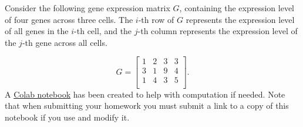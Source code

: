 \documentclass[11pt]{exam}
\begin{document}
\begin{questions}
\begin{parts}
\end{parts} 

\newpage
\question[46]

Consider the following gene expression matrix $G$, containing the expression level of four genes across three cells. The $i$-th row of $G$ represents the expression level of all genes in the $i$-th cell, and the $j$-th column represents the expression level of the $j$-th gene across all cells.

\[ 
G = \begin{bmatrix}
1 & 2 & 3 & 3 \\
3 & 1 & 9 & 4 \\
1 & 4 & 3 & 5 \\
\end{bmatrix}.  
\]
 A \href{https://github.com/pachterlab/Bi-BE-CS-183-2023/blob/main/HW1/Problem2.ipynb}{Colab notebook} has been created to help with computation if needed. Note that when submitting your homework you must submit a link to a copy of this notebook if you use and modify it.
\vspace{0.1pt}
\end{questions}
\end{document}
